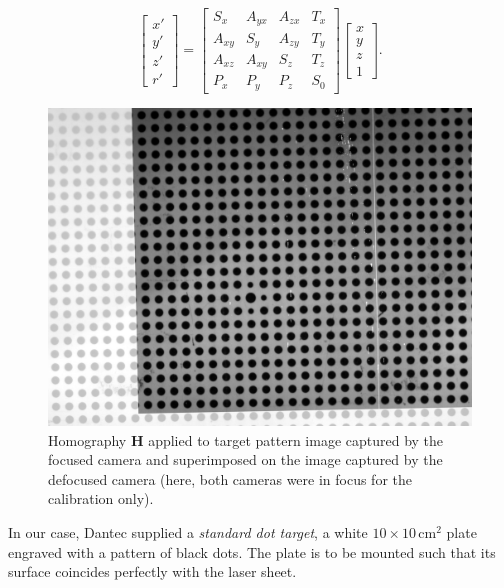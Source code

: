 \documentclass[11.5pt]{book}
\begin{document}
\begin{equation}
\left[\begin{array}{c} x'\\ y'\\ z'\\ r' \end{array} \right]
=
\left[ \begin{array}{cccc}
S_x & A_{yx} & A_{zx} & T_x \\
A_{xy} & S_y & A_{zy} & T_y \\
A_{xz} & A_{xy} & S_z & T_z \\
P_x & P_y & P_z & S_0
\end{array} \right]
\left[ \begin{array}{c} x\\ y \\ z \\ 1 \end{array} \right].
\end{equation}
\begin{figure}
    \centering
    \includegraphics[height=0.45\textheight]{img/orb/plate-calibration.jpg}
    \caption{Homography $\mathbf{H}$ applied to target pattern image captured by
        the focused camera and superimposed on the image captured by the
        defocused camera (here, both cameras were in focus for the calibration
        only).
    \label{fig:plate-calibration}}
\end{figure}

In our case, Dantec supplied a \emph{standard dot target}, a white $10 \times 10\,
\mathrm{cm}^2$ plate engraved with a pattern of black dots. The plate is to be
mounted such that its surface coincides perfectly with the laser sheet. 
\end{document}
